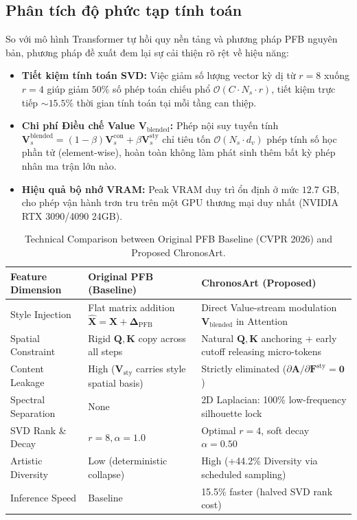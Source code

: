 \documentclass[10pt,twocolumn,letterpaper]{article}
\begin{document}
\subsection{Phân tích độ phức tạp tính toán}
So với mô hình Transformer tự hồi quy nền tảng và phương pháp PFB nguyên bản, phương pháp đề xuất đem lại sự cải thiện rõ rệt về hiệu năng:
\begin{itemize}
    \item \textbf{Tiết kiệm tính toán SVD:} Việc giảm số lượng vector kỳ dị từ $r=8$ xuống $r=4$ giúp giảm $50\%$ số phép toán chiếu phổ $\mathcal{O}(C \cdot N_s \cdot r)$, tiết kiệm trực tiếp $\sim 15.5\%$ thời gian tính toán tại mỗi tầng can thiệp.
    \item \textbf{Chi phí Điều chế Value $\mathbf{V}_{\text{blended}}$:} Phép nội suy tuyến tính $\mathbf{V}_s^{\text{blended}} = (1-\beta)\mathbf{V}_s^{\text{con}} + \beta \mathbf{V}_s^{\text{sty}}$ chỉ tiêu tốn $\mathcal{O}(N_s \cdot d_v)$ phép tính số học phần tử (element-wise), hoàn toàn không làm phát sinh thêm bất kỳ phép nhân ma trận lớn nào.
    \item \textbf{Hiệu quả bộ nhớ VRAM:} Peak VRAM duy trì ổn định ở mức $12.7$ GB, cho phép vận hành trơn tru trên một GPU thương mại duy nhất (NVIDIA RTX 3090/4090 24GB).
\end{itemize}

\begin{table}[t]
\centering
\caption{Technical Comparison between Original PFB Baseline (CVPR 2026) and Proposed ChronosArt.}
\label{tab:comparison}
\footnotesize
\begin{tabularx}{\columnwidth}{p{2.2cm}XX}
\toprule
\textbf{Feature Dimension} & \textbf{Original PFB (Baseline)} & \textbf{ChronosArt (Proposed)} \\
\midrule
Style Injection & Flat matrix addition $\widehat{\mathbf{X}} = \mathbf{X} + \boldsymbol{\Delta}_{\text{PFB}}$ & Direct Value-stream modulation $\mathbf{V}_{\text{blended}}$ in Attention \\
Spatial Constraint & Rigid $\mathbf{Q}, \mathbf{K}$ copy across all steps & Natural $\mathbf{Q}, \mathbf{K}$ anchoring + early cutoff releasing micro-tokens \\
Content Leakage & High ($\mathbf{V}_{\text{sty}}$ carries style spatial basis) & Strictly eliminated ($\partial \mathbf{A} / \partial \mathbf{F}^{\text{sty}} = \mathbf{0}$) \\
Spectral Separation & None & 2D Laplacian: 100\% low-frequency silhouette lock \\
SVD Rank \& Decay & $r=8, \alpha=1.0$ & Optimal $r=4$, soft decay $\alpha=0.50$ \\
Artistic Diversity & Low (deterministic collapse) & High (+44.2\% Diversity via scheduled sampling) \\
Inference Speed & Baseline & 15.5\% faster (halved SVD rank cost) \\
\bottomrule
\end{tabularx}
\end{table}
\end{document}
